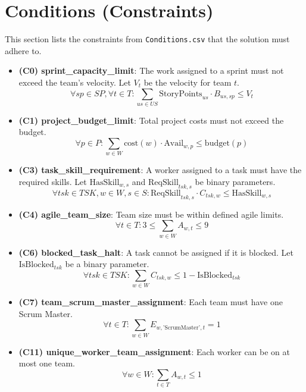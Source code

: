 \documentclass[11pt]{article}
\begin{document}
\section{Conditions (Constraints)}
This section lists the constraints from \texttt{Conditions.csv} that the solution must adhere to.
\begin{itemize}
    \item \textbf{(C0) sprint\_capacity\_limit}: The work assigned to a sprint must not exceed the team's velocity. Let $V_t$ be the velocity for team $t$.
    $$ \forall sp \in SP, \forall t \in T: \sum_{us \in US} \text{StoryPoints}_{us} \cdot B_{us,sp} \leq V_t $$
    \item \textbf{(C1) project\_budget\_limit}: Total project costs must not exceed the budget.
    $$ \forall p \in P: \sum_{w \in W} \text{cost}(w) \cdot \text{Avail}_{w,p} \leq \text{budget}(p) $$
    \item \textbf{(C3) task\_skill\_requirement}: A worker assigned to a task must have the required skills. Let $\text{HasSkill}_{w,s}$ and $\text{ReqSkill}_{tsk,s}$ be binary parameters.
    $$ \forall tsk \in TSK, w \in W, s \in S: \text{ReqSkill}_{tsk,s} \cdot C_{tsk,w} \leq \text{HasSkill}_{w,s} $$
    \item \textbf{(C4) agile\_team\_size}: Team size must be within defined agile limits.
    $$ \forall t \in T: 3 \leq \sum_{w \in W} A_{w,t} \leq 9 $$
    \item \textbf{(C6) blocked\_task\_halt}: A task cannot be assigned if it is blocked. Let $\text{IsBlocked}_{tsk}$ be a binary parameter.
    $$ \forall tsk \in TSK: \sum_{w \in W} C_{tsk,w} \leq 1 - \text{IsBlocked}_{tsk} $$
    \item \textbf{(C7) team\_scrum\_master\_assignment}: Each team must have one Scrum Master.
    $$ \forall t \in T: \sum_{w \in W} E_{w, \text{'ScrumMaster'}, t} = 1 $$
    \item \textbf{(C11) unique\_worker\_team\_assignment}: Each worker can be on at most one team.
    $$ \forall w \in W: \sum_{t \in T} A_{w,t} \leq 1 $$
\end{itemize}
\end{document}
